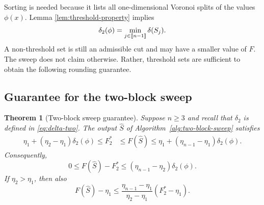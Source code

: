 \documentclass[11pt]{article}
\newtheorem{theorem}{Theorem}[section]
\newcommand{\1}{\mathbf{1}}
\providecommand{\llbracket}{\mathopen{[\mkern-2.7mu[}}
\providecommand{\rrbracket}{\mathclose{]\mkern-2.7mu]}}
\begin{document}
Sorting is needed because it lists all one-dimensional Voronoi splits
of the values $\phi(x)$.  Lemma \ref{lem:threshold-property} implies
\begin{equation}
    \delta_2(\phi)=\min_{j\in\llbracket n-1\rrbracket}\delta(S_j).
    \label{eq:delta-sweep}
\end{equation}
A non-threshold set is still an admissible cut and may have a smaller
value of $F$.  The sweep does not claim otherwise.  Rather, threshold
sets are sufficient to obtain the following rounding guarantee.

\subsection{Guarantee for the two-block sweep}

\begin{theorem}[Two-block sweep guarantee]
\label{thm:two-block-guarantee}
Suppose $n\geq3$ and recall that $\delta_2$ is defined in \eqref{eq:delta-two}. The output $\widehat S$ of
Algorithm~\ref{alg:two-block-sweep} satisfies
\begin{equation}
\begin{split}
    \eta_1+(\eta_2-\eta_1)\delta_2(\phi)
    \leq F_2^*&\leq F(\widehat S)
    \leq
    \eta_1+(\eta_{n-1}-\eta_1)\delta_2(\phi).
\end{split}
    \label{eq:two-block-chain}
\end{equation}
Consequently,
\begin{equation}
    0\leq F(\widehat S)-F_2^*
    \leq(\eta_{n-1}-\eta_2)\delta_2(\phi).
    \label{eq:two-block-gap}
\end{equation}
If $\eta_2>\eta_1$, then also
\begin{equation}
    F(\widehat S)-\eta_1
    \leq
    \frac{\eta_{n-1}-\eta_1}{\eta_2-\eta_1}
    (F_2^*-\eta_1).
    \label{eq:two-block-relative}
\end{equation}
\end{theorem}
\end{document}
